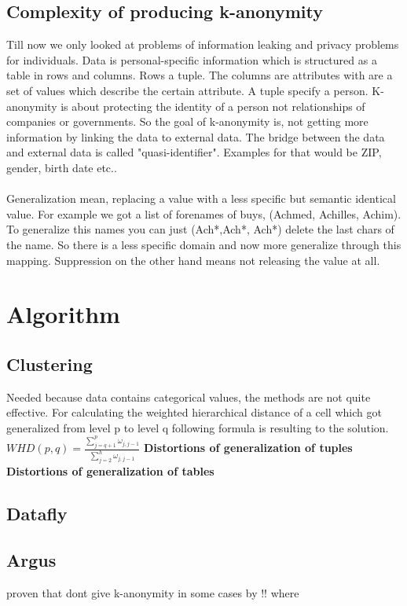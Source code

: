 \documentclass{llncs}
\begin{document}
\subsection{Complexity of producing k-anonymity}
Till now we only looked at problems of information leaking and privacy problems for individuals. Data is personal-specific information which is structured as a table in rows and columns. Rows a tuple. The columns are attributes with are a set of values which describe the certain attribute. A tuple specify a person. K-anonymity is about protecting the identity of a person not relationships of companies or governments. So the goal of k-anonymity is, not getting more information by linking the data to external data. The bridge between the data and external data is called "quasi-identifier". Examples for that would be ZIP, gender, birth date etc.. \\
\\
Generalization mean, replacing a value with a less specific but semantic identical value. For example we got a list of forenames of buys, (Achmed, Achilles, Achim). To generalize this names you can just (Ach*,Ach*, Ach*) delete the last chars of the name. So there is a less specific domain and now more generalize through this mapping. Suppression on the other hand means not releasing the value at all.

\section{Algorithm}
\subsection{Clustering}
Needed because data contains categorical values, the methods are not quite effective.
\cite{li2006achieving}
For calculating the weighted hierarchical distance of a cell which got generalized from level p to level q following formula is resulting to the solution.\\
$ WHD (p, q) = \frac{\sum_{j=q+1}^{p} \omega_{j,j-1}}{\sum_{j=2}^{h} \omega_{j,j-1}} $
\textbf{Distortions of generalization of tuples}
\textbf{Distortions of generalization of tables}


\subsection{Datafly}

\subsection{Argus}
proven that dont give k-anonymity in some cases by \cite{sweeney2002achieving}!! where


\newpage


\end{document}
